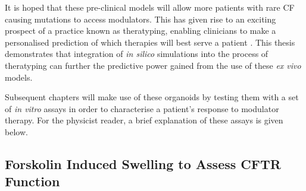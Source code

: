 It is hoped that these pre-clinical models will allow more patients with rare CF causing mutations to access modulators. This has given rise to an exciting prospect of a practice known as theratyping, enabling clinicians to make a personalised prediction of which therapies will best serve a patient \cite{clancy2019, wong2022, wong2022a, ciciriello2022}. This thesis demonstrates that integration of \textit{in silico} simulations into the process of theratyping can further the predictive power gained from the use of these \textit{ex vivo} models.


Subsequent chapters will make use of these organoids by testing them with a set of \textit{in vitro} assays in order to characterise a patient's response to modulator therapy. For the physicist reader, a brief explanation of these assays is given below.

\subsection{Forskolin Induced Swelling to Assess CFTR Function}

